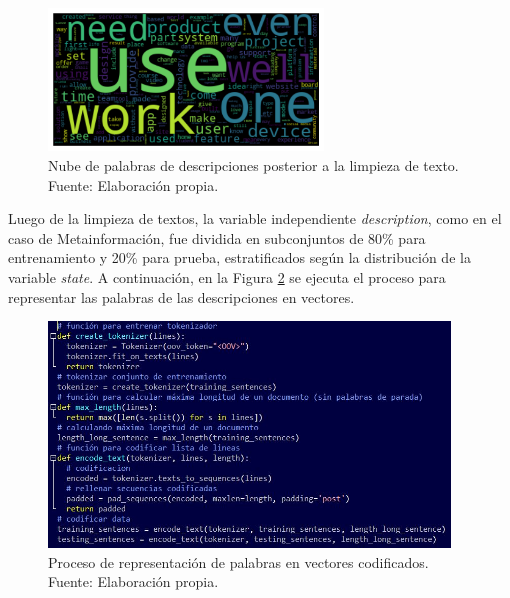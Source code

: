 \begin{figure}[!ht]
	\begin{center}
		\includegraphics[width=0.65\textwidth]{4/figures/description_wordcloud.png}
		\caption[Nube de palabras de descripciones posterior a la limpieza de texto]{Nube de palabras de descripciones posterior a la limpieza de texto.\\
			Fuente: Elaboración propia.}
		\label{4:fig30}
	\end{center}
\end{figure}

Luego de la limpieza de textos, la variable independiente \textit{description}, como en el caso de Metainformación, fue dividida en subconjuntos de 80\% para entrenamiento y 20\% para prueba, estratificados según la distribución de la variable \textit{state}. A continuación, en la Figura \ref{4:fig31} se ejecuta el proceso para representar las palabras de las descripciones en vectores.

\begin{figure}[!ht]
	\begin{center}
		\includegraphics[width=0.95\textwidth]{4/figures/description_word_representation.jpg}
		\caption[Proceso de representación de palabras en vectores codificados]{Proceso de representación de palabras en vectores codificados.\\
			Fuente: Elaboración propia.}
		\label{4:fig31}
	\end{center}
\end{figure}

